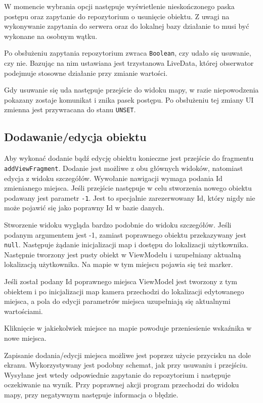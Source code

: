 \documentclass[polish,polish,a4paper,12pt]{article}
\begin{document}
	W momencie wybrania opcji następuje wyświetlenie nieskończonego paska postępu oraz zapytanie do repozytorium o usunięcie obiektu. Z uwagi na wykonywanie zapytania do serwera oraz do lokalnej bazy działanie to musi być wykonane na osobnym wątku.

	Po obsłużeniu zapytania repozytorium zwraca \texttt{Boolean}, czy udało się usuwanie, czy nie. Bazując na nim ustawiana jest trzystanowa LiveData, której obserwator podejmuje stosowne działanie przy zmianie wartości.

	Gdy usuwanie się uda następuje przejście do widoku mapy, w razie niepowodzenia pokazany zostaje komunikat i znika pasek postępu. Po obsłużeniu tej zmiany UI zmienna jest przywracana do stanu \texttt{UNSET}.

	\subsection{Dodawanie/edycja obiektu}

	Aby wykonać dodanie bądź edycję obiektu konieczne jest przejście do fragmentu \texttt{addViewFragment}. Dodanie jest możliwe z obu głównych widoków, natomiast edycja z widoku szczegółów. Wywołanie nawigacji wymaga podania Id zmienianego miejsca. Jeśli przejście następuje w celu stworzenia nowego obiektu podawany jest parametr \texttt{-1}. Jest to specjalnie zarezerwowany Id, który nigdy nie może pojawić się jako poprawny Id w bazie danych.

	Stworzenie widoku wygląda bardzo podobnie do widoku szczegółów. Jeśli podanym argumentem jest -1, zamiast poprawnego obiektu przekazywany jest \texttt{null}. Następuje żądanie inicjalizacji map i dostępu do lokalizacji użytkownika. Następnie tworzony jest pusty obiekt w ViewModelu i uzupełniany aktualną lokalizacją użytkownika. Na mapie w tym miejscu pojawia się też marker.

	Jeśli został podany Id poprawnego miejsca ViewModel jest tworzony z tym obiektem i po inicjalizacji map kamera przechodzi do lokalizacji edytowanego miejsca, a pola do edycji parametrów miejsca uzupełniają się aktualnymi wartościami.

	Kliknięcie w jakiekolwiek miejsce na mapie powoduje przeniesienie wskaźnika w nowe miejsca.

	Zapisanie dodania/edycji miejsca możliwe jest poprzez użycie przycisku na dole ekranu. Wykorzystywany jest podobny schemat, jak przy usuwaniu i przejściu. Wysyłane jest wtedy odpowiednie zapytanie do repozytorium i następuje oczekiwanie na wynik. Przy poprawnej akcji program przechodzi do widoku mapy, przy negatywnym następuje informacja o błędzie.
\end{document}
